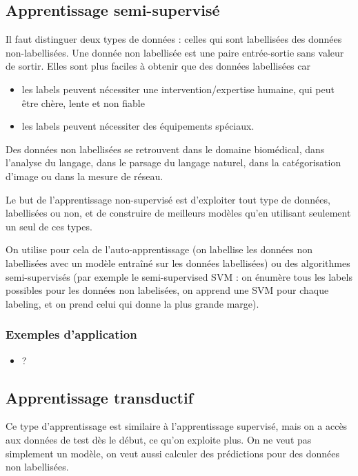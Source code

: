 		\subsection{Apprentissage semi-supervisé}
		
		Il faut distinguer deux types de données : celles qui sont labellisées des données non-labellisées. Une donnée non labellisée est une paire entrée-sortie sans valeur de sortir. Elles sont plus faciles à obtenir que des données labellisées car
		
		\begin{itemize}
			\item les labels peuvent nécessiter une intervention/expertise humaine, qui peut être chère, lente et non fiable
			\item les labels peuvent nécessiter des équipements spéciaux.
		\end{itemize}
		
		Des données non labellisées se retrouvent dans le domaine biomédical, dans l'analyse du langage, dans le parsage du langage naturel, dans la catégorisation d'image ou dans la mesure de réseau.
				
		Le but de l'apprentissage non-supervisé est d'exploiter tout type de données, labellisées ou non, et de construire de meilleurs modèles qu'en utilisant seulement un seul de ces types.
		
		On utilise pour cela de l'auto-apprentissage (on labellise les données non labellisées avec un modèle entraîné sur les données labellisées) ou des algorithmes semi-supervisés (par exemple le semi-supervised SVM : on énumère tous les labels possibles pour les données non labelisées, on apprend une SVM pour chaque labeling, et on prend celui qui donne la plus grande marge).
			
			\subsubsection{Exemples d'application}
			
			\begin{itemize}
				\item ?
			\end{itemize}
		
		\subsection{Apprentissage transductif}
		
		Ce type d'apprentissage est similaire à l'apprentissage supervisé, mais on a accès aux données de test dès le début, ce qu'on exploite plus. On ne veut pas simplement un modèle, on veut aussi calculer des prédictions pour des données non labellisées.
		
